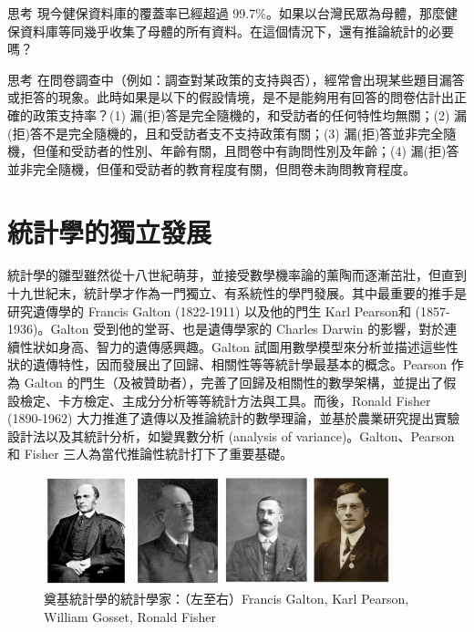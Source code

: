     \bigskip
    
    \begin{custom}{思考}
        現今健保資料庫的覆蓋率已經超過 99.7\%。如果以台灣民眾為母體，那麼健保資料庫等同幾乎收集了母體的所有資料。在這個情況下，還有推論統計的必要嗎？
    \end{custom}
    
    \bigskip
    
    \begin{custom}{思考}
        在問卷調查中（例如：調查對某政策的支持與否），經常會出現某些題目漏答或拒答的現象。此時如果是以下的假設情境，是不是能夠用有回答的問卷估計出正確的政策支持率？(1) 漏(拒)答是完全隨機的，和受訪者的任何特性均無關；(2) 漏(拒)答不是完全隨機的，且和受訪者支不支持政策有關；(3) 漏(拒)答並非完全隨機，但僅和受訪者的性別、年齡有關，且問卷中有詢問性別及年齡；(4) 漏(拒)答並非完全隨機，但僅和受訪者的教育程度有關，但問卷未詢問教育程度。
    \end{custom}
    
\section{統計學的獨立發展}

    統計學的雛型雖然從十八世紀萌芽，並接受數學機率論的薰陶而逐漸茁壯，但直到十九世紀末，統計學才作為一門獨立、有系統性的學門發展。其中最重要的推手是研究遺傳學的 Francis Galton (1822-1911) 以及他的門生 Karl Pearson和 (1857-1936)。Galton 受到他的堂哥、也是遺傳學家的 Charles Darwin 的影響，對於連續性狀如身高、智力的遺傳感興趣。Galton 試圖用數學模型來分析並描述這些性狀的遺傳特性，因而發展出了回歸、相關性等等統計學最基本的概念。Pearson 作為 Galton 的門生（及被贊助者），完善了回歸及相關性的數學架構，並提出了假設檢定、卡方檢定、主成分分析等等統計方法與工具。而後，Ronald Fisher (1890-1962) 大力推進了遺傳以及推論統計的數學理論，並基於農業研究提出實驗設計法以及其統計分析，如變異數分析 (analysis of variance)。Galton、Pearson 和 Fisher 三人為當代推論性統計打下了重要基礎。
    
    \begin{figure}[htbp]
      \centering
      \includegraphics[width=0.9\textwidth]{figures/01-Overview/statisticians.png}
      \caption{奠基統計學的統計學家：（左至右）Francis Galton, Karl Pearson, William Gosset, Ronald Fisher}
      \label{fig:statisticians}
    \end{figure}